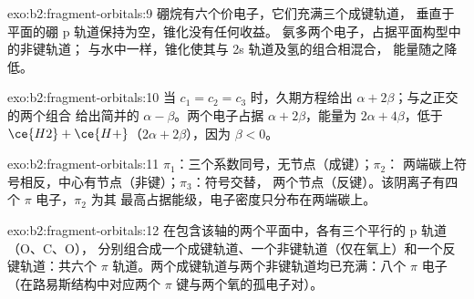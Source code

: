 \begin{solution}{exo:b2:fragment-orbitals:9}
硼烷有六个价电子，它们充满三个成键轨道，
垂直于平面的硼 p 轨道保持为空，锥化没有任何收益。
氨多两个电子，占据平面构型中的非键轨道；
与水中一样，锥化使其与 2s 轨道及氢的组合相混合，
能量随之降低。
\end{solution}

\begin{solution}{exo:b2:fragment-orbitals:10}
当 $c_1 = c_2 = c_3$ 时，久期方程给出 $\alpha + 2\beta$；与之正交的两个组合
给出简并的 $\alpha - \beta$。两个电子占据 $\alpha + 2\beta$，能量为
$2\alpha + 4\beta$，低于 $\ce{H2} + \ce{H+}$（$2\alpha + 2\beta$），因为 $\beta < 0$。
\end{solution}

\begin{solution}{exo:b2:fragment-orbitals:11}
$\pi_1$：三个系数同号，无节点（成键）；$\pi_2$：
两端碳上符号相反，中心有节点（非键）；$\pi_3$：符号交替，
两个节点（反键）。该阴离子有四个 $\pi$ 电子，$\pi_2$ 为其
最高占据能级，电子密度只分布在两端碳上。
\end{solution}

\begin{solution}{exo:b2:fragment-orbitals:12}
在包含该轴的两个平面中，各有三个平行的 p 轨道（O、C、O），
分别组合成一个成键轨道、一个非键轨道（仅在氧上）和一个反键轨道：共六个
$\pi$ 轨道。两个成键轨道与两个非键轨道均已充满：八个
$\pi$ 电子（在路易斯结构中对应两个 $\pi$ 键与两个氧的孤电子对）。
\end{solution}


